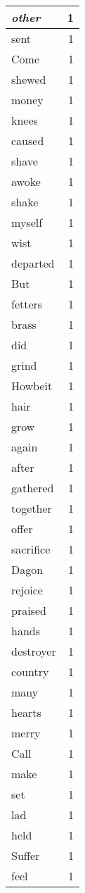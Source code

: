 \begin{center}
\begin{longtable}{l|r}
\emph{other} & 1\\ \hline 
sent & 1\\ \hline 
Come & 1\\ \hline 
shewed & 1\\ \hline 
money & 1\\ \hline 
knees & 1\\ \hline 
caused & 1\\ \hline 
shave & 1\\ \hline 
awoke & 1\\ \hline 
shake & 1\\ \hline 
myself & 1\\ \hline 
wist & 1\\ \hline 
departed & 1\\ \hline 
But & 1\\ \hline 
fetters & 1\\ \hline 
brass & 1\\ \hline 
did & 1\\ \hline 
grind & 1\\ \hline 
Howbeit & 1\\ \hline 
hair & 1\\ \hline 
grow & 1\\ \hline 
again & 1\\ \hline 
after & 1\\ \hline 
gathered & 1\\ \hline 
together & 1\\ \hline 
offer & 1\\ \hline 
sacrifice & 1\\ \hline 
Dagon & 1\\ \hline 
rejoice & 1\\ \hline 
praised & 1\\ \hline 
hands & 1\\ \hline 
destroyer & 1\\ \hline 
country & 1\\ \hline 
many & 1\\ \hline 
hearts & 1\\ \hline 
merry & 1\\ \hline 
Call & 1\\ \hline 
make & 1\\ \hline 
set & 1\\ \hline 
lad & 1\\ \hline 
held & 1\\ \hline 
Suffer & 1\\ \hline 
feel & 1\\ \hline 

\end{longtable}
\end{center}
